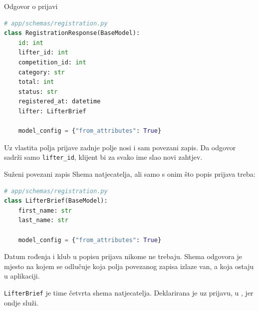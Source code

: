 \begin{frame}[fragile]{Odgovor o prijavi}
\begin{lstlisting}[language=python]
# app/schemas/registration.py
class RegistrationResponse(BaseModel):
    id: int
    lifter_id: int
    competition_id: int
    category: str
    total: int
    status: str
    registered_at: datetime
    lifter: LifterBrief

    model_config = {"from_attributes": True}
\end{lstlisting}

\vspace{0.4em}
Uz vlastita polja prijave zadnje polje nosi i sam povezani zapis. Da odgovor sadrži samo \texttt{lifter\_id}, klijent bi za svako ime slao novi zahtjev.
\end{frame}

\begin{frame}[fragile]{Suženi povezani zapis}
Shema natjecatelja, ali samo s onim što popis prijava treba:

\begin{lstlisting}[language=python]
# app/schemas/registration.py
class LifterBrief(BaseModel):
    first_name: str
    last_name: str

    model_config = {"from_attributes": True}
\end{lstlisting}

\vspace{0.4em}
Datum rođenja i klub u popisu prijava nikome ne trebaju. Shema odgovora je mjesto na kojem se odlučuje koja polja povezanog zapisa izlaze van, a koja ostaju u aplikaciji.

\vspace{0.7em}
\texttt{LifterBrief} je time četvrta shema natjecatelja. Deklarirana je uz prijavu, u , jer ondje služi.
\end{frame}



